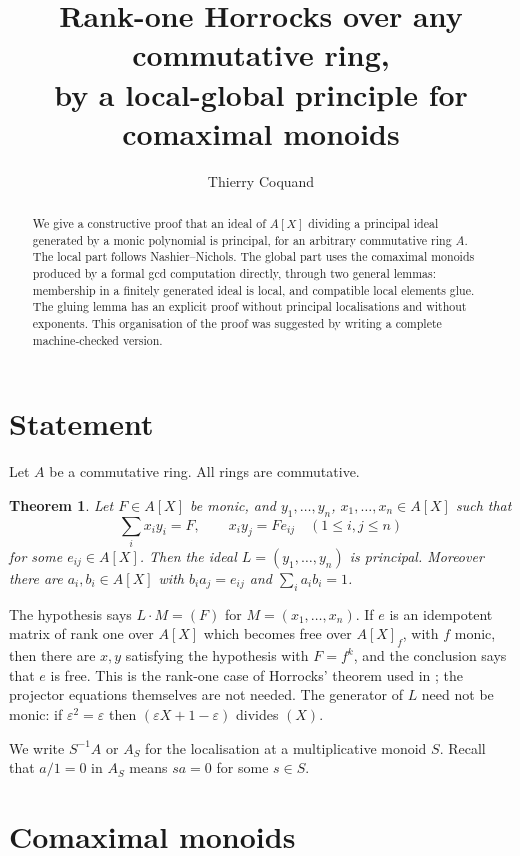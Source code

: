 \documentclass[11pt]{amsart}
\title{Rank-one Horrocks over any commutative ring,\\ by a local-global principle for comaximal monoids}
\author{Thierry Coquand}
\date{}
\newtheorem{theorem}{Theorem}
\theoremstyle{remark}
\begin{document}
\begin{abstract}
We give a constructive proof that an ideal of $A[X]$ dividing a principal ideal
generated by a monic polynomial is principal, for an arbitrary commutative
ring $A$. The local part follows Nashier--Nichols. The global part uses the
comaximal monoids produced by a formal gcd computation directly, through two
general lemmas: membership in a finitely generated ideal is local, and
compatible local elements glue. The gluing lemma has an explicit proof without
principal localisations and without exponents. This organisation of the proof
was suggested by writing a complete machine-checked version.
\end{abstract}

\maketitle

\section{Statement}

Let $A$ be a commutative ring. All rings are commutative.

\begin{theorem}\label{thm:main}
Let $F\in A[X]$ be monic, and $y_1,\dots,y_n$, $x_1,\dots,x_n\in A[X]$ such that
\[
\textstyle\sum_i x_iy_i = F,\qquad x_iy_j = F e_{ij}\quad(1\le i,j\le n)
\]
for some $e_{ij}\in A[X]$. Then the ideal $L=(y_1,\dots,y_n)$ is principal.
Moreover there are $a_i,b_i\in A[X]$ with $b_ia_j=e_{ij}$ and $\sum_i a_ib_i=1$.
\end{theorem}

The hypothesis says $L\cdot M=(F)$ for $M=(x_1,\dots,x_n)$. If $e$ is an
idempotent matrix of rank one over $A[X]$ which becomes free over $A[X]_f$,
with $f$ monic, then there are $x,y$ satisfying the hypothesis with $F=f^k$,
and the conclusion says that $e$ is free. This is the rank-one case of
Horrocks' theorem used in \cite{Proj}; the projector equations themselves are
not needed. The generator of $L$ need not be monic: if $\varepsilon^2=\varepsilon$
then $(\varepsilon X+1-\varepsilon)$ divides $(X)$.

We write $S^{-1}A$ or $A_S$ for the localisation at a multiplicative monoid $S$.
Recall that $a/1=0$ in $A_S$ means $sa=0$ for some $s\in S$.

\section{Comaximal monoids}
\end{document}
